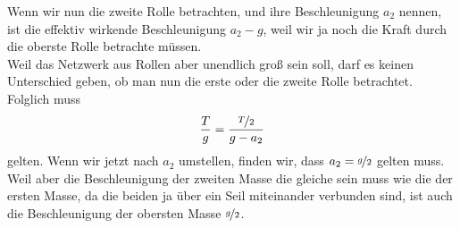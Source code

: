 \begin{Answer}[ref = atwood]
	Wenn wir nun die zweite Rolle betrachten, und ihre Beschleunigung $a_2$ nennen, ist die effektiv wirkende Beschleunigung $a_2-g$, weil wir ja noch die Kraft durch die oberste Rolle betrachte müssen.\\
	Weil das \glqq Netzwerk\grqq{} aus Rollen aber unendlich groß sein soll, darf es keinen Unterschied geben, ob man nun die erste oder die zweite Rolle betrachtet. Folglich muss
	\begin{equation}\label{atwood:accsol1}
		\frac{T}{g} = \frac{\nicefrac{T}{2}}{g-a_2}
	\end{equation}
	gelten. Wenn wir jetzt nach $a_2$ umstellen, finden wir, dass $a_2 = \nicefrac{g}{2}$ gelten muss. Weil aber die Beschleunigung der zweiten Masse die gleiche sein muss wie die der ersten Masse, da die beiden ja über ein Seil miteinander verbunden sind, ist auch die Beschleunigung der obersten Masse $\nicefrac{g}{2}$.\\
	
\end{Answer}
